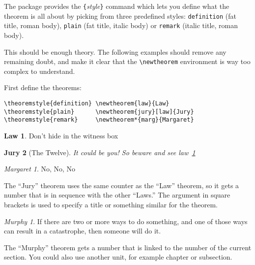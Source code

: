 The  package provides the \verb|{|\emph{style}\verb|}|
command which lets you define what the theorem is all about by picking
from three predefined styles: \texttt{definition} (fat title, roman body),
\texttt{plain} (fat title, italic body) or \texttt{remark} (italic
title, roman body).

This should be enough theory. The following examples should
remove any remaining doubt, and make it clear that the
\verb|\newtheorem| environment is way too complex to understand.

\theoremstyle{definition} \newtheorem{law}{Law}
\theoremstyle{plain}      \newtheorem{jury}[law]{Jury}
\theoremstyle{remark}     \newtheorem*{marg}{Margaret}

First define the theorems:

\begin{verbatim}
\theoremstyle{definition} \newtheorem{law}{Law}
\theoremstyle{plain}      \newtheorem{jury}[law]{Jury}
\theoremstyle{remark}     \newtheorem*{marg}{Margaret}
\end{verbatim}

\begin{example}
\begin{law} \label{law:box}
Don't hide in the witness box
\end{law}
\begin{jury}[The Twelve]
It could be you! So beware and
see law~\ref{law:box}\end{jury}
\begin{marg}No, No, No\end{marg}
\end{example}

The ``Jury'' theorem uses the same counter as the ``Law''
theorem, so it gets a number that is in sequence with
the other ``Laws.'' The argument in square brackets is used to specify 
a title or something similar for the theorem.
\begin{example}
\flushleft
\newtheorem{mur}{Murphy}[section]
\begin{mur}
If there are two or more 
ways to do something, and 
one of those ways can result 
in a catastrophe, then 
someone will do it.\end{mur}
\end{example}

The ``Murphy'' theorem gets a number that is linked to the number of
the current section. You could also use another unit, for example chapter or
subsection.

